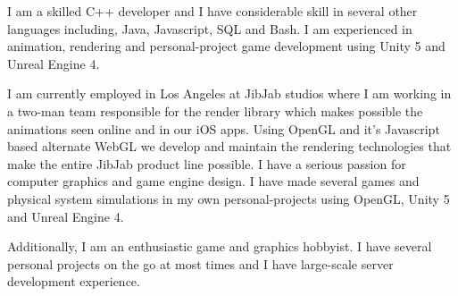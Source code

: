 I am a skilled C++ developer and I have considerable skill in several other languages including, Java, Javascript, SQL and Bash.
I am experienced in animation, rendering and personal-project game development using Unity 5 and Unreal Engine 4.

I am currently employed in Los Angeles at JibJab studios where I am working in a two-man team responsible for the render library which makes possible the animations seen online and in our iOS apps.
Using OpenGL and it's Javascript based alternate WebGL we develop and maintain the rendering technologies that make the entire JibJab product line possible. 
I have a serious passion for computer graphics and game engine design.
I have made several games and physical system simulations in my own personal-projects using OpenGL, Unity 5 and Unreal Engine 4.

Additionally, I am an enthusiastic game and graphics hobbyist.
I have several personal projects on the go at most times and I have large-scale server development experience.




